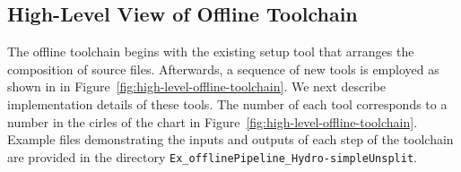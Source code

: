 \documentclass{article}
\begin{document}
\subsection{High-Level View of Offline Toolchain}
\label{sec:high-level-offline-toolchain}

The offline toolchain begins with the existing setup tool that arranges the
composition of source files.  Afterwards, a sequence of new tools is employed
as shown in in Figure~\ref{fig:high-level-offline-toolchain}.  We next describe
implementation details of these tools.  The number of each tool
corresponds to a number in the cirles of the chart in
Figure~\ref{fig:high-level-offline-toolchain}.
Example files demonstrating the inputs and outputs of each step of the toolchain are provided
in the directory \texttt{Ex\_offlinePipeline\_Hydro-simpleUnsplit}.
\end{document}
